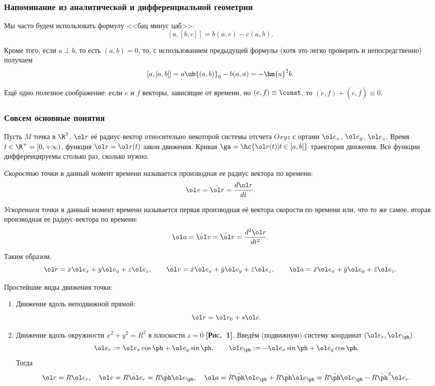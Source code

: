 \documentclass[a4paper,12pt]{article}
\def\a{\ol a}
\def\r{\ol r}
\def\v{\ol v}
\def\e{\ol e}
\def\dd{\ddot}
\def\d{\dot}
\def\pic#1{ \hbox{\textbf{\textsc{[Рис.~#1]}}}}
\begin{document}
\subsubsection{Напоминание из аналитической и дифференциальной геометрии}

Мы часто будем использовать формулу <<бац минус цаб>>:
$$[a,[b,c]] = b(a,c) - c(a,b).$$

Кроме того, если $a \perp b$, то есть $(a,b) = 0$, то, с использованием предыдущей формулы
(хотя это легко проверить и непосредственно) получаем
$$[a,[a,b]] = a\ub{(a,b)}_0 - b(a,a) = -\hm{a}^2 b.$$

Ещё одно полезное соображение: если $e$ и $f$ векторы, зависящие от времени,
но $(e,f) \equiv \const$,
то $(\d e, f) + (e, \d f) \equiv 0$.

\subsubsection{Совсем основные понятия}

Пусть $M$ точка в $\R^3$,  $\r$ её радиус-вектор относительно
некоторой системы отсчета $Oxyz$ с ортами $\e_x$, $\e_y$, $\e_z$.
Время $t\in\R^+=[0,+\infty)$, функция $\r=\r(t)$ закон движения.
Кривая $\ga=\hc{\r(t)| t\in[a,b]}$ траектория движения. Все функции
дифференцируемы столько раз, сколько нужно.

\begin{df}
\emph{Скоростью} точки в данный момент времени
называется производная ее радиус вектора по времени:
$$\v=\d {\r}=\frac{d\r}{dt}.$$
\end{df}

\begin{df}
\emph{Ускорением} точки в данный момент времени
называется первая производная её вектора скорости по времени или,
что то же самое, вторая производная ее радиус-вектора по времени:
$$\a=\d \v = \dd \r=\frac{d^2\r}{dt^2}.$$
\end{df}

Таким образом,
$$\r=x\e_x+y\e_y+z\e_z,\qquad \v=\d x\e_x+\d y\e_y+\d z\e_z,\qquad \a=\dd x\e_x+\dd y\e_y+\dd z\e_z.$$

\begin{ex}
Простейшие виды движения точки:

\begin{enumerate}
\item Движение вдоль неподвижной прямой:
$$\r=\r_0+s\e.$$
\item Движение вдоль окружности $x^2+y^2=R^2$ в плоскости $z =0$ \pic{1}.
Введём (подвижную) систему координат $(\e_r,\e_\ph)$.
$$\e_r:=\e_x\cos\ph+\e_y\sin\ph,\qquad\e_\ph:=-\e_x\sin\ph+\e_y\cos\ph.$$
Тогда
$$\r=R\e_r,\quad \v=R\d\e_r=R \d\ph \e_\ph,\quad \a=R \dd\ph \e_\ph + R\d\ph\d\e_\ph = R\dd\ph\e_\ph -R\d\ph^2\e_r.$$
\end{enumerate}
\end{ex}
\end{document}
